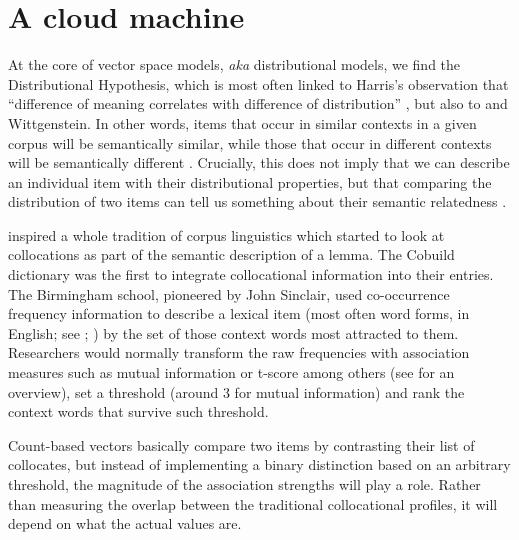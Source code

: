 \documentclass[
]{book}
\begin{document}
\hypertarget{vector-creation}{%
\section{A cloud machine}\label{vector-creation}}

At the core of vector space models, \emph{aka} distributional models, we find the Distributional Hypothesis, which is most often linked to Harris's observation that ``difference of meaning correlates with difference of distribution'' \autocite*[ 156]{harris_1954}, but also to \textcite{firth_1957a} and Wittgenstein.
In other words, items that occur in similar contexts in a given corpus will be semantically similar, while those that occur in different contexts will be semantically different \autocites[ Ch. 6]{jurafsky.martin_2020}{lenci_2018}. Crucially, this does not imply that we can describe an individual item with their distributional properties, but that comparing the distribution of two items can tell us something about their semantic relatedness \autocite[ 19]{sahlgren_2006}.

\textcite{firth_1957a} inspired a whole tradition of corpus linguistics which started to look at collocations as part of the semantic description of a lemma. The Cobuild dictionary was the first to integrate collocational information into their entries. The Birmingham school, pioneered by John Sinclair, used co-occurrence frequency information to describe a lexical item (most often word forms, in English; see \textcite[29]{sinclair_1991}; \textcite[23-24]{stubbs_1995}) by the set of those context words most attracted to them. Researchers would normally transform the raw frequencies with association measures such as mutual information
\autocites[ 33]{church.hanks_1989,stubbs_1995}{mcenery.etal_2010,gablasova.etal_2017}
or t-score
among others (see \textcite{gablasova.etal_2017} for an overview),
set a threshold (around 3 for mutual information)
and rank the context words that survive such threshold.

Count-based vectors basically compare two items by contrasting their list of collocates, but instead of implementing a binary distinction based on an arbitrary threshold,
the magnitude of the association strengths will play a role. Rather than measuring the overlap between the traditional collocational profiles, it will depend on what the actual values are.
\end{document}

